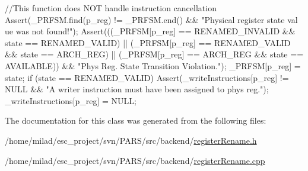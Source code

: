 \begin{DoxyCode}
                                                              {
        //This function does NOT handle instruction cancellation
        Assert(_PRFSM.find(p_reg) != _PRFSM.end() && "Physical register state val
      ue was not found!");
        Assert(((_PRFSM[p_reg] == RENAMED_INVALID && state == RENAMED_VALID) ||
                        (_PRFSM[p_reg] == RENAMED_VALID && state == ARCH_REG) ||
                        (_PRFSM[p_reg] == ARCH_REG && state == AVAILABLE)) &&
                        "Phys Reg. State Transition Violation.");
        _PRFSM[p_reg] = state;
        if (state == RENAMED_VALID) {
                Assert(_writeInstructions[p_reg] != NULL && "A writer instruction
       must have been assigned to phys reg.");
                _writeInstructions[p_reg] = NULL;
        }
}
\end{DoxyCode}


The documentation for this class was generated from the following files:\begin{DoxyCompactItemize}
\item 
/home/milad/esc\_\-project/svn/PARS/src/backend/\hyperlink{backend_2registerRename_8h}{registerRename.h}\item 
/home/milad/esc\_\-project/svn/PARS/src/backend/\hyperlink{backend_2registerRename_8cpp}{registerRename.cpp}\end{DoxyCompactItemize}
